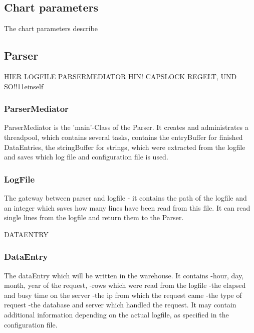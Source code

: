 \subsection{Chart parameters}
The chart parameters describe 
\subsection{}


\subsection{Parser}

HIER LOGFILE  PARSERMEDIATOR HIN!
CAPSLOCK REGELT, UND SO!!11einself %

\subsubsection*{ParserMediator}
ParserMediator is the 'main'-Class of the Parser. It creates and administrates a threadpool, which contains several tasks, 
contains the entryBuffer for finished DataEntries, the stringBuffer for strings, which were extracted 
from the logfile and saves which log file and configuration file is used.

\subsubsection*{LogFile}
The gateway between parser and logfile - it contains the path of the logfile and an integer 
which saves how many lines have been read from this file. It can read single lines from the logfile and return them to 
the Parser.

DATAENTRY

\subsubsection*{DataEntry}
The dataEntry which will be written in the warehouse.
It contains 
-hour, day, month, year of the request,
-rows which were read  from the logfile%
-the elapsed and busy time on the server
-the ip from which the request came
-the type of request
-the database and server which handled the request. %
It may contain additional information depending on the actual logfile, as specified in the configuration file. %

